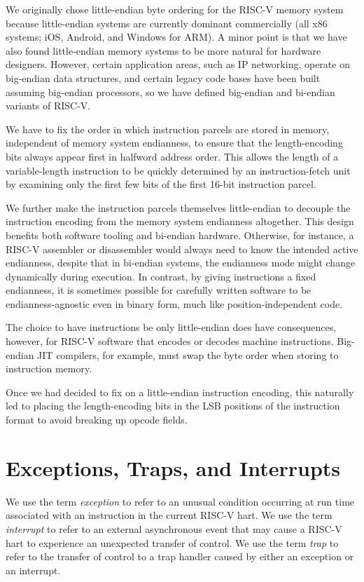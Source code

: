 \begin{commentary}
We originally chose little-endian byte ordering for the RISC-V memory system
because little-endian systems are currently dominant commercially (all
x86 systems; iOS, Android, and Windows for ARM).  A minor point is
that we have also found little-endian memory systems to be more
natural for hardware designers.  However, certain application areas,
such as IP networking, operate on big-endian data structures, and
certain legacy code bases have been built assuming big-endian
processors, so we have defined big-endian and bi-endian variants of RISC-V.

We have to fix the order in which instruction parcels are stored in
memory, independent of memory system endianness, to ensure that the
length-encoding bits always appear first in halfword address
order. This allows the length of a variable-length instruction to be
quickly determined by an instruction-fetch unit by examining only the
first few bits of the first 16-bit instruction parcel.

We further make the instruction parcels themselves little-endian to decouple
the instruction encoding from the memory system endianness altogether.
This design benefits both software tooling and bi-endian hardware.
Otherwise, for instance, a RISC-V assembler or disassembler would always need
to know the intended active endianness, despite that in bi-endian systems, the
endianness mode might change dynamically during execution.
In contrast, by giving instructions a fixed endianness, it is sometimes
possible for carefully written software to be endianness-agnostic even in
binary form, much like position-independent code.

The choice to have instructions be only little-endian does have consequences,
however, for RISC-V software that encodes or decodes machine instructions.
Big-endian JIT compilers, for example, must swap the byte order when storing
to instruction memory.

Once we had decided to fix on a little-endian instruction encoding, this
naturally led to placing the length-encoding bits in the LSB positions of the
instruction format to avoid breaking up opcode fields.
\end{commentary}

\section{Exceptions, Traps, and Interrupts}

We use the term {\em exception} to refer to an unusual condition
occurring at run time associated with an instruction in the current
RISC-V hart.  We use the term {\em interrupt} to refer to an external
asynchronous event that may cause a RISC-V hart to experience an
unexpected transfer of control.  We use the term {\em trap} to refer
to the transfer of control to a trap handler caused by either an
exception or an interrupt.

